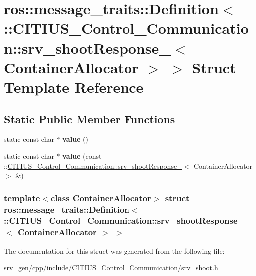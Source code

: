 \hypertarget{structros_1_1message__traits_1_1_definition_3_01_1_1_c_i_t_i_u_s___control___communication_1_1sr023f7ee06905f265c0129abf03cdf622}{\section{ros\-:\-:message\-\_\-traits\-:\-:\-Definition$<$ \-:\-:\-C\-I\-T\-I\-U\-S\-\_\-\-Control\-\_\-\-Communication\-:\-:srv\-\_\-shoot\-Response\-\_\-$<$ \-Container\-Allocator $>$ $>$ \-Struct \-Template \-Reference}
\label{structros_1_1message__traits_1_1_definition_3_01_1_1_c_i_t_i_u_s___control___communication_1_1sr023f7ee06905f265c0129abf03cdf622}
}
\subsection*{\-Static \-Public \-Member \-Functions}
\begin{DoxyCompactItemize}
\item 
\hypertarget{structros_1_1message__traits_1_1_definition_3_01_1_1_c_i_t_i_u_s___control___communication_1_1sr023f7ee06905f265c0129abf03cdf622_af040bf4eb9c4bdcc58701ffa8c99de1e}{static const char $\ast$ {\bfseries value} ()}\label{structros_1_1message__traits_1_1_definition_3_01_1_1_c_i_t_i_u_s___control___communication_1_1sr023f7ee06905f265c0129abf03cdf622_af040bf4eb9c4bdcc58701ffa8c99de1e}

\item 
\hypertarget{structros_1_1message__traits_1_1_definition_3_01_1_1_c_i_t_i_u_s___control___communication_1_1sr023f7ee06905f265c0129abf03cdf622_a863c00c3dfe28b1035b8ec9320837819}{static const char $\ast$ {\bfseries value} (const \-::\hyperlink{struct_c_i_t_i_u_s___control___communication_1_1srv__shoot_response__}{\-C\-I\-T\-I\-U\-S\-\_\-\-Control\-\_\-\-Communication\-::srv\-\_\-shoot\-Response\-\_\-}$<$ \-Container\-Allocator $>$ \&)}\label{structros_1_1message__traits_1_1_definition_3_01_1_1_c_i_t_i_u_s___control___communication_1_1sr023f7ee06905f265c0129abf03cdf622_a863c00c3dfe28b1035b8ec9320837819}

\end{DoxyCompactItemize}
\subsubsection*{template$<$class Container\-Allocator$>$ struct ros\-::message\-\_\-traits\-::\-Definition$<$ \-::\-C\-I\-T\-I\-U\-S\-\_\-\-Control\-\_\-\-Communication\-::srv\-\_\-shoot\-Response\-\_\-$<$ Container\-Allocator $>$ $>$}



\-The documentation for this struct was generated from the following file\-:\begin{DoxyCompactItemize}
\item 
srv\-\_\-gen/cpp/include/\-C\-I\-T\-I\-U\-S\-\_\-\-Control\-\_\-\-Communication/srv\-\_\-shoot.\-h\end{DoxyCompactItemize}
